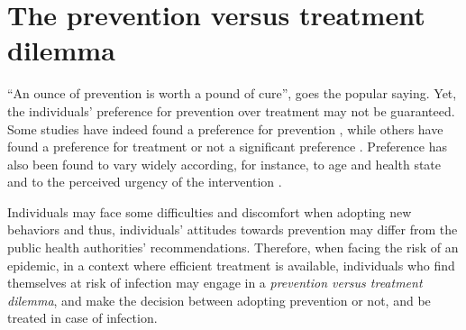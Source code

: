 %
%
%
%

\section{The prevention versus treatment dilemma}
\label{Intro:Dilemma}

``An ounce of prevention is worth a pound of cure'', goes the popular saying. Yet, the individuals' preference for prevention over treatment may not be guaranteed. Some studies have indeed found a preference for prevention \cite[]{Bosworth2010,Mortimer2008}, while others have found a preference for treatment \cite[]{Corso2002,Schwappach2002} or not a significant preference \cite[]{Ubel1998}. Preference has also been found to vary widely according, for instance, to age and health state \cite[]{Luyten2015} and to the perceived urgency of the intervention \cite[]{Meertens2013}. 

Individuals may face some difficulties and discomfort when adopting new behaviors and thus, individuals' attitudes towards prevention may differ from the public health authorities' recommendations. Therefore, when facing the risk of an epidemic, in a context where efficient treatment is available, individuals who find themselves at risk of infection may engage in a \textit{prevention versus treatment dilemma}, and make the decision between adopting prevention or not, and be treated in case of infection. 

